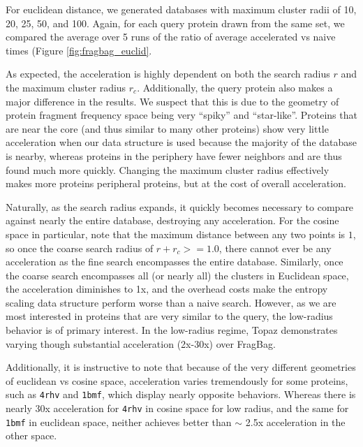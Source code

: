\documentclass[review,preprint,12pt]{elsarticle}
\theoremstyle{definition}
\theoremstyle{remark}
\numberwithin{equation}{section}
\begin{document}
For euclidean distance, we generated databases with maximum cluster radii of 10, 20, 25, 50, and 100.
Again, for each query protein drawn from the same set, we compared the average over 5 runs of the ratio of average accelerated vs naive times (Figure \ref{fig:fragbag_euclid}.

As expected, the acceleration is highly dependent on both the search radius $r$ and the maximum cluster radius $r_c$.
Additionally, the query protein also makes a major difference in the results.
We suspect that this is due to the geometry of protein fragment frequency space being very ``spiky'' and ``star-like''.
Proteins that are near the core (and thus similar to many other proteins) show very little acceleration when our data structure is used because the majority of the database is nearby, whereas proteins in the periphery have fewer neighbors and are thus found much more quickly.
Changing the maximum cluster radius effectively makes more proteins peripheral proteins, but at the cost of overall acceleration.

Naturally, as the search radius expands, it quickly becomes necessary to compare against nearly the entire database, destroying any acceleration.
For the cosine space in particular, note that the maximum distance between any two points is $1$, so once the coarse search radius of $r+r_c >= 1.0$, there cannot ever be any acceleration as the fine search encompasses the entire database.
Similarly, once the coarse search encompasses all (or nearly all) the clusters in Euclidean space, the acceleration diminishes to 1x, and the overhead costs make the entropy scaling data structure perform worse than a naive search.
However, as we are most interested in proteins that are very similar to the query, the low-radius behavior is of primary interest.
In the low-radius regime, Topaz demonstrates varying though substantial acceleration (2x-30x) over FragBag.

Additionally, it is instructive to note that because of the very different geometries of euclidean vs cosine space, acceleration varies tremendously for some proteins, such as \texttt{4rhv} and \texttt{1bmf}, which display nearly opposite behaviors.
Whereas there is nearly 30x acceleration for \texttt{4rhv} in cosine space for low radius, and the same for \texttt{1bmf} in euclidean space, neither achieves better than $\sim$ 2.5x acceleration in the other space.
\end{document}

